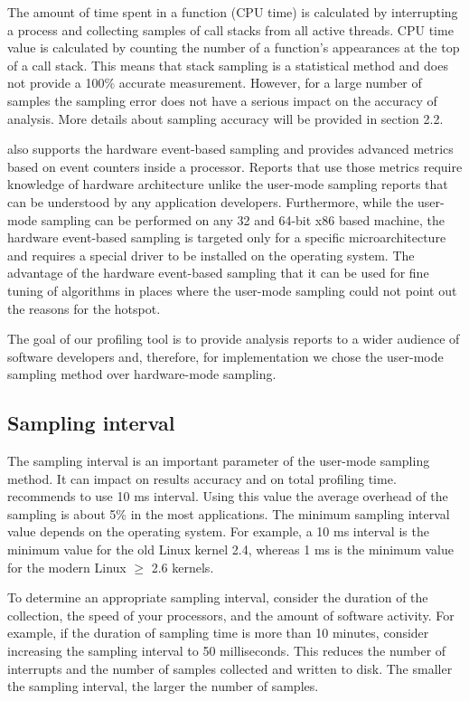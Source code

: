 \documentclass[a4paper]{jpconf}
\begin{document}
The amount of time spent in a function (CPU time) is calculated by interrupting a process and collecting samples of 
call stacks from all active threads. CPU time value is calculated by counting the number of  a function's appearances at 
the top of a call stack. This means that stack sampling is a statistical method and does not provide a 100\% accurate 
measurement. However, for a large number of samples the sampling error does not have a serious impact on the accuracy of 
analysis. More details about sampling accuracy will be provided in section 2.2.

\amp also supports the hardware event-based sampling and provides advanced metrics based on event counters inside 
a processor. Reports that use those metrics require  knowledge of hardware architecture  unlike the user-mode 
sampling reports that can be understood by any application developers. Furthermore, while the user-mode sampling can 
be performed on any 32 and 64-bit x86 based machine, the hardware event-based sampling is targeted only for a specific 
\intel microarchitecture and requires a special driver to be installed on the operating system. The advantage of 
the hardware event-based sampling that it can be used for fine tuning of algorithms in places where  the user-mode 
sampling could not point out the reasons for the hotspot.

The goal of our profiling tool is to provide analysis reports to a wider audience of software developers and, therefore, 
for implementation we chose the user-mode sampling method over hardware-mode sampling.

\subsection{Sampling interval}

The sampling interval is an important parameter of the user-mode sampling method. It can impact on results accuracy and 
on total profiling time. \intel recommends to use 10 ms interval. Using this value the average overhead of the sampling 
is about 5\% in the most applications. The minimum sampling interval value depends on the operating system. For example, a 10 ms interval 
is the minimum value for the old Linux kernel 2.4, whereas 1 ms is the minimum value for the modern Linux $\ge$ 2.6 kernels.

To determine an appropriate sampling interval, consider the duration of the collection, the speed of your processors, 
and the amount of software activity. For example, if the duration of sampling time is more than 10 minutes, 
consider increasing the sampling interval to 50 milliseconds. This reduces the number of interrupts and 
the number of samples collected and written to disk. The smaller the sampling interval, the larger the number of samples.
\end{document}
